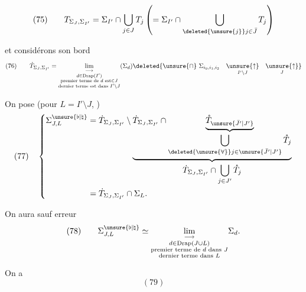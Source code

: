 
\[
(75)\qquad T_{\Sigma_J,\Sigma_{I'}}=\Sigma_{I'}\cap\bigcup_{j\in J}T_j\left(=\Sigma_{I'}\cap\bigcup_{\deleted{\unsure{j}}j\in\bar J}T_j\right)
\]

et considérons son bord
\[
(76)\qquad\dot T_{\Sigma_J,\Sigma_{I'}}=
\underset{\substack{d\in\mathrm{Drap}(I')\\\text{premier terme de }d\text{ est}\in J\\\text{dernier terme est dans }I'\setminus J}}{\lim_{\longrightarrow}}(\Sigma_d)
\deleted{\unsure{\cap}\ \Sigma_{i_0,i_1,i_2}\quad\underset{I'\setminus J}{\unsure{\uparrow}}\quad\underset{J}{\unsure{\uparrow}}}
\]

On pose (pour $L=I'\setminus J$, )
\[
(77)\quad\left\{
\begin{aligned}
\Sigma_{J,L}^{\unsure{\flat|\natural}}&=\dot T_{\Sigma_J,\Sigma_{I'}}\setminus
\underbrace{\dot T_{\Sigma_J,\Sigma_{I'}}\cap
\underbrace{\mathring T_{\unsure{\bar J'|J'}}}_{\displaystyle\bigcup_{\deleted{\unsure{\forall}}j\in\unsure{\bar J'|J'}}\mathring T_j}}_{\displaystyle\dot T_{\Sigma_J,\Sigma_{I'}}\cap\bigcup_{j\in J'}\mathring T_j}\\
&=\dot T_{\Sigma_J,\Sigma_{I'}}\cap\Sigma_L.
\end{aligned}\right.
\]

On aura sauf erreur
\[
(78)\qquad\Sigma_{J,L}^{\unsure{\flat|\natural}}\simeq
\underset{\substack{d\in\mathrm{Drap}(J\cup L)\\\text{premier terme de }d\text{ dans }J\\\text{dernier terme dans }L}}{\lim_{\longrightarrow}}\Sigma_d.
\]

On a
\[
(79)
\]
